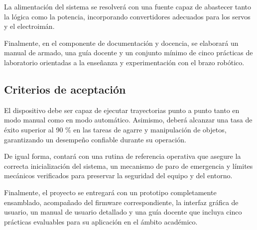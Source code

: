 La alimentación del sistema se resolverá con una fuente capaz de abastecer tanto la lógica como la potencia, incorporando convertidores adecuados para los servos y el electroimán.

\vspace{1em}

Finalmente, en el componente de documentación y docencia, se elaborará un manual de armado, una guía docente y un conjunto mínimo de cinco prácticas de laboratorio orientadas a la enseñanza y experimentación con el brazo robótico.

\subsection{Criterios de aceptación}
El dispositivo debe ser capaz de ejecutar trayectorias punto a punto tanto en modo manual como en modo automático. Asimismo, deberá alcanzar una tasa de éxito superior al 90 \% en las tareas de agarre y manipulación de objetos, garantizando un desempeño confiable durante su operación.

\vspace{1em}

De igual forma, contará con una rutina de referencia operativa que asegure la correcta inicialización del sistema, un mecanismo de paro de emergencia y límites mecánicos verificados para preservar la seguridad del equipo y del entorno.

\vspace{1em}

Finalmente, el proyecto se entregará con un prototipo completamente ensamblado, acompañado del firmware correspondiente, la interfaz gráfica de usuario, un manual de usuario detallado y una guía docente que incluya cinco prácticas evaluables para su aplicación en el ámbito académico.

